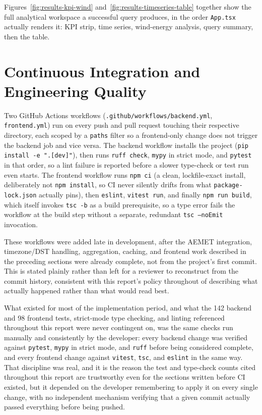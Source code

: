 \documentclass[11pt,a4paper]{article}
\begin{document}
Figures~\ref{fig:results-kpi-wind} and~\ref{fig:results-timeseries-table}
together show the full analytical workspace a successful query produces,
in the order \texttt{App.tsx} actually renders it: KPI strip, time series,
wind-energy analysis, query summary, then the table.

\section{Continuous Integration and Engineering Quality}
\label{sec:ci}

Two GitHub Actions workflows
(\texttt{.github/workflows/backend.yml}, \texttt{frontend.yml}) run on
every push and pull request touching their respective directory, each
scoped by a \texttt{paths} filter so a frontend-only change does not
trigger the backend job and vice versa. The backend workflow installs the
project (\texttt{pip install -e ".[dev]"}), then runs \texttt{ruff check},
\texttt{mypy} in strict mode, and \texttt{pytest} in that order, so a lint
failure is reported before a slower type-check or test run even starts.
The frontend workflow runs \texttt{npm ci} (a clean, lockfile-exact
install, deliberately not \texttt{npm install}, so CI never silently drifts
from what \texttt{package-lock.json} actually pins), then
\texttt{eslint}, \texttt{vitest run}, and finally \texttt{npm run build},
which itself invokes \texttt{tsc -b} as a build prerequisite, so a type
error fails the workflow at the build step without a separate, redundant
\texttt{tsc --noEmit} invocation.

These workflows were added late in development, after the AEMET
integration, timezone/DST handling, aggregation, caching, and frontend
work described in the preceding sections were already complete, not from
the project's first commit. This is stated plainly rather than left for a
reviewer to reconstruct from the commit history, consistent with this
report's policy throughout of describing what actually happened rather
than what would read best.

What existed for most of the implementation period, and what the 142
backend and 98 frontend tests, strict-mode type checking, and linting
referenced throughout this report were never contingent on, was the same
checks run manually and consistently by the developer: every backend
change was verified against \texttt{pytest}, \texttt{mypy} in strict mode,
and \texttt{ruff} before being considered complete, and every frontend
change against \texttt{vitest}, \texttt{tsc}, and \texttt{eslint} in the
same way. That discipline was real, and it is the reason the test and
type-check counts cited throughout this report are trustworthy even for
the sections written before CI existed, but it depended on the developer
remembering to apply it on every single change, with no independent
mechanism verifying that a given commit actually passed everything before
being pushed.
\end{document}
